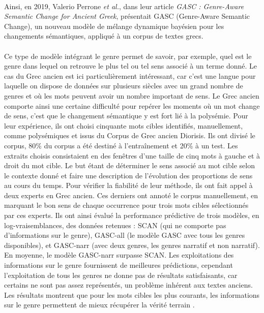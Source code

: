 \documentclass{article}
\begin{document}
\paragraph{}
Ainsi, en 2019, Valerio Perrone \textit{et al.}, dans leur article \textit{GASC : Genre-Aware Semantic Change for Ancient Greek}, présentait GASC (Genre-Aware Semantic Change), un nouveau modèle de mélange dynamique bayésien pour les changements sémantiques, appliqué à un corpus de textes grecs.  
\paragraph{}
Ce type de modèle intégrant le genre permet de savoir, par exemple, quel est le genre dans lequel on retrouve le plus tel ou tel sens associé à un terme donné. Le cas du Grec ancien est ici particulièrement intéressant, car c’est une langue pour laquelle on dispose de données sur plusieurs siècles avec un grand nombre de genres et où les mots peuvent avoir un nombre important de sens. Le Grec ancien comporte ainsi une certaine difficulté pour repérer les moments où un mot change de sens, c’est que le changement sémantique y est fort lié à la polysémie\cite[p. 2]{perrone2019gasc}. Pour leur expérience, ils ont choisi cinquante mots cibles identifiés, manuellement, comme polysémiques et issus du Corpus de Grec ancien Diorisis. Ils ont divisé le corpus, 80\% du corpus a été destiné à l’entraînement et 20\% à un test. Les extraits choisis consistaient en des fenêtres d’une taille de cinq mots à gauche et à droit du mot cible. Le but étant de déterminer le sens associé au mot cible selon le contexte donné et faire une description de l’évolution des proportions de sens au cours du temps. Pour vérifier la fiabilité de leur méthode, ils ont fait appel à deux experts en Grec ancien. Ces derniers ont annoté le corpus manuellement, en marquant le bon sens de chaque occurrence pour trois mots cibles sélectionnés par ces experts. Ils ont ainsi évalué la performance prédictive de trois modèles, en log-vraisemblances, des données retenues : SCAN (qui ne comporte pas d’informations sur le genre), GASC-all (le modèle GASC avec tous les genres disponibles), et GASC-narr (avec deux genres, les genres narratif et non narratif). En moyenne, le modèle GASC-narr surpasse SCAN. Les exploitations des informations sur le genre fournissent de meilleures prédictions, cependant l’exploitation de tous les genres ne donne pas de résultats satisfaisants, car certains ne sont pas assez représentés, un problème inhérent aux textes anciens. Les résultats montrent que pour les mots cibles les plus courants, les informations sur le genre permettent de mieux récupérer la vérité terrain \cite{perrone2019gasc}. 
\end{document}
